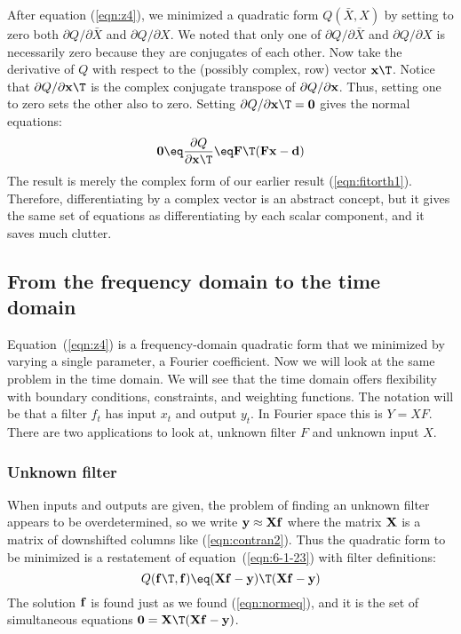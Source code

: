 After equation (\ref{eqn:z4}),
we minimized a quadratic form $Q(\bar X,X)$
by setting to zero both
$\partial Q/\partial \bar X$ and $\partial Q/\partial X$.
We noted that only one of
$\partial Q/\partial \bar X$ and $\partial Q/\partial X$
is necessarily zero
because they are conjugates of each other.
Now take the derivative of $Q$
with respect to the (possibly complex, row) vector $\bold x\T$.
Notice that $\partial Q/\partial  \bold x\T$ is the complex conjugate transpose
of $\partial Q/\partial  \bold x$.
Thus, setting one to zero sets the other also to zero.
Setting $\partial Q/\partial \bold x\T =\bold 0$ gives the normal equations:
\begin{equation}
\bold 0 \eq \frac{\partial Q}{\partial \bold x\T} \eq
\bold F\T (\bold F \bold x - \bold d)
\label{eqn:normeq}
\end{equation}
The result is merely the complex form of
our earlier result (\ref{eqn:fitorth1}).
Therefore,
differentiating by a complex vector
is an abstract concept,
but it gives the same set of equations
as differentiating by each scalar component,
and it saves much clutter.

\subsection{From the frequency domain to the time domain}
Equation~(\ref{eqn:z4}) is a frequency-domain quadratic form
that we minimized by varying a single parameter,
a Fourier coefficient.
Now we will look at the same problem in the time domain.
We will see that the time domain offers flexibility with
boundary conditions, constraints, and weighting functions.
The notation will be that a filter $f_t$ has input $x_t$ and output $y_t$.
In Fourier space this is $Y=XF$.
There are two applications to look at,
unknown filter $F$ and unknown input $X$.

\subsubsection{Unknown filter}
When inputs and outputs are given,
the problem of finding an unknown filter appears to be overdetermined,
so we write $\bold y \approx \bold X \bold f$
where the matrix $\bold X$ is a matrix of downshifted columns like
(\ref{eqn:contran2}).
Thus the quadratic form to be minimized
is a restatement of equation~(\ref{eqn:6-1-23})
with filter definitions:
\begin{equation}
Q(\bold f\T, \bold f) \eq
(\bold X\bold f - \bold y)\T
(\bold X\bold f - \bold y)
\end{equation}
The solution $\bold f$ is found just as we found
(\ref{eqn:normeq}),
and it is the set of simultaneous equations
$ \bold 0 = \bold X\T(\bold X\bold f - \bold y)$.

